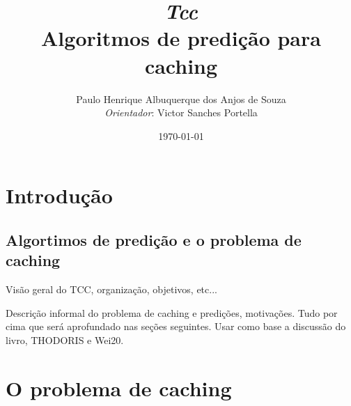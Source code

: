 \documentclass[a4paper,oneside,reqno,12pt]{amsart}
\begin{document}
\baselineskip
\frenchspacing

% 
% 

\setcounter{page}{1}

\title{%
{\small\sl Tcc}\\
\smallskip
Algoritmos de predição para caching}

\author{%
Paulo Henrique Albuquerque dos Anjos de Souza \\
{\tiny\emph{Orientador}:  Victor Sanches Portella}
}
%
%

\date{\today}
\maketitle

\pagestyle{plain}
\footskip=25pt

\vspace{-20pt}


\section{Introdução}

\subsection{Algortimos de predição e o problema de caching}

Visão geral do TCC, organização, objetivos, etc...

Descrição informal do problema de caching e predições, motivações. Tudo por cima que será aprofundado nas seções seguintes. Usar como base a discussão do livro, THODORIS e Wei20.

\section{O problema de caching}
\end{document}
